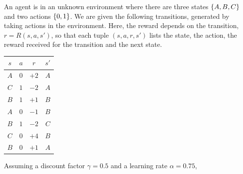 \documentclass[11pt, a4paper]{exam}
\begin{document}
\begin{exercises}
An agent is in an unknown environment where there are three states $\{A, B, C\}$ and two actions $\{0, 1\}$. We are given the following transitions, generated by taking actions in the environment. Here, the reward depends on the transition, $r = R(s, a, s')$, so that each tuple $(s, a, r, s')$ lists the state, the action, the reward received for the transition and the next state.

\begin{center}
    \begin{tabular}{cccc}
        \toprule
        $s$ & $a$ & $r$ & $s'$ \\
        \midrule
        $A$ & $0$ & $+2$ & $A$ \\
        $C$ & $1$ & $-2$ & $A$ \\
        $B$ & $1$ & $+1$ & $B$ \\
        $A$ & $0$ & $-1$ & $B$ \\
        $B$ & $1$ & $-2$ & $C$ \\
        $C$ & $0$ & $+4$ & $B$ \\
        $B$ & $0$ & $+1$ & $A$ \\
        \bottomrule
    \end{tabular}
\end{center}

Assuming a discount factor $\gamma = 0.5$ and a learning rate $\alpha = 0.75$,

\end{exercises}
\end{document}
